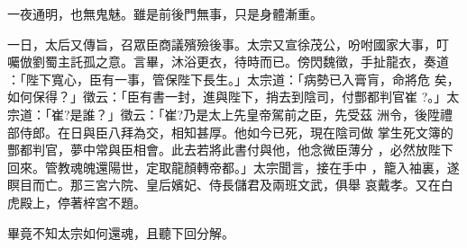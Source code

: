 \begin{pinyinscope}
{一夜通明，也無鬼魅。雖是前後門無事，只是身體漸重。

一日，太后又傳旨，召眾臣商議殯殮後事。太宗又宣徐茂公，吩咐國家大事，叮
囑倣劉蜀主託孤之意。言畢，沐浴更衣，待時而已。傍閃魏徵，手扯龍衣，奏道
：「陛下寬心，臣有一事，管保陛下長生。」太宗道：「病勢已入膏肓，命將危
矣，如何保得？」徵云：「臣有書一封，進與陛下，捎去到陰司，付酆都判官崔
?。」太宗道：「崔?是誰？」徵云：「崔?乃是太上先皇帝駕前之臣，先受茲
洲令，後陞禮部侍郎。在日與臣八拜為交，相知甚厚。他如今已死，現在陰司做
掌生死文簿的酆都判官，夢中常與臣相會。此去若將此書付與他，他念微臣薄分
，必然放陛下回來。管教魂魄還陽世，定取龍顏轉帝都。」太宗聞言，接在手中
，籠入袖裏，遂瞑目而亡。那三宮六院、皇后嬪妃、侍長儲君及兩班文武，俱舉
哀戴孝。又在白虎殿上，停著梓宮不題。

畢竟不知太宗如何還魂，且聽下回分解。





}
\end{pinyinscope}
